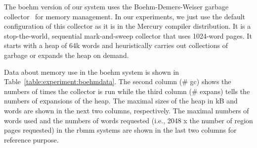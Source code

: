 \documentclass{tlp}
\begin{document}
The boehm version of our system uses
the Boehm-Demers-Weiser garbage collector~\cite{Boehm88} for memory management.
In our experiments,
we just use the default configuration of this collector
as it is in the Mercury compiler distribution.
It is a stop-the-world, sequential mark-and-sweep collector
that uses 1024-word pages.
It starts with a heap of 64k words and
heuristically carries out collections of garbage or expands the heap on demand.

Data about memory use in the boehm system
is shown in Table~\ref{table:experiment:boehmdata}.
The second column (\# gc) shows the numbers of times the collector is run while
the third column (\# expans) tells the numbers of expansions of the heap.
The maximal sizes of the heap in kB and words
are shown in the next two columns, respectively.
The maximal numbers of words used and the numbers of words requested
(i.e., 2048 x the number of region pages requested)
in the rbmm systems are shown in the last two columns for reference purpose.
\end{document}
